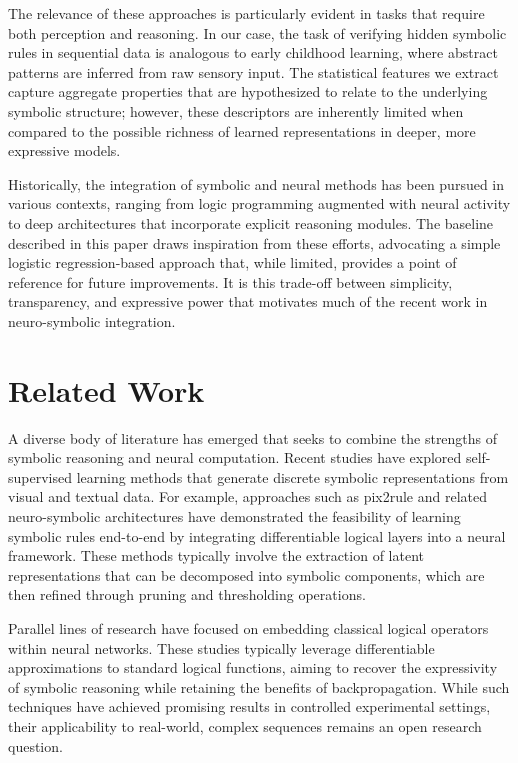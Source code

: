 \documentclass{article}
\begin{document}
The relevance of these approaches is particularly evident in tasks that require both perception and reasoning. In our case, the task of verifying hidden symbolic rules in sequential data is analogous to early childhood learning, where abstract patterns are inferred from raw sensory input. The statistical features we extract capture aggregate properties that are hypothesized to relate to the underlying symbolic structure; however, these descriptors are inherently limited when compared to the possible richness of learned representations in deeper, more expressive models.

Historically, the integration of symbolic and neural methods has been pursued in various contexts, ranging from logic programming augmented with neural activity to deep architectures that incorporate explicit reasoning modules. The baseline described in this paper draws inspiration from these efforts, advocating a simple logistic regression-based approach that, while limited, provides a point of reference for future improvements. It is this trade-off between simplicity, transparency, and expressive power that motivates much of the recent work in neuro-symbolic integration.

\section{Related Work}
A diverse body of literature has emerged that seeks to combine the strengths of symbolic reasoning and neural computation. Recent studies have explored self-supervised learning methods that generate discrete symbolic representations from visual and textual data. For example, approaches such as pix2rule and related neuro-symbolic architectures have demonstrated the feasibility of learning symbolic rules end-to-end by integrating differentiable logical layers into a neural framework. These methods typically involve the extraction of latent representations that can be decomposed into symbolic components, which are then refined through pruning and thresholding operations.

Parallel lines of research have focused on embedding classical logical operators within neural networks. These studies typically leverage differentiable approximations to standard logical functions, aiming to recover the expressivity of symbolic reasoning while retaining the benefits of backpropagation. While such techniques have achieved promising results in controlled experimental settings, their applicability to real-world, complex sequences remains an open research question. 
\end{document}
